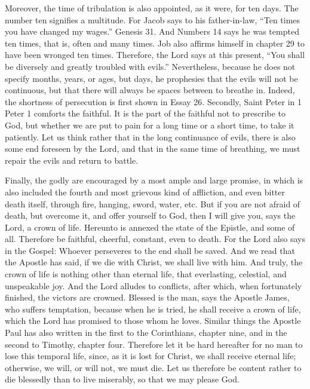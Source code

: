 Moreover, the time of tribulation is also appointed, as it were, for ten days. The number ten signifies a multitude. For Jacob says to his father-in-law, “Ten times you have changed my wages.” Genesis 31. And Numbers 14 says he was tempted ten times, that is, often and many times. Job also affirms himself in chapter 29 to have been wronged ten times. Therefore, the Lord says at this present, “You shall be diversely and greatly troubled with evils.” Nevertheless, because he does not specify months, years, or ages, but days, he prophesies that the evils will not be continuous, but that there will always be spaces between to breathe in. Indeed, the shortness of persecution is first shown in Essay 26. Secondly, Saint Peter in 1 Peter 1 comforts the faithful. It is the part of the faithful not to prescribe to God, but whether we are put to pain for a long time or a short time, to take it patiently. Let us think rather that in the long continuance of evils, there is also some end foreseen by the Lord, and that in the same time of breathing, we must repair the evils and return to battle.

Finally, the godly are encouraged by a most ample and large promise, in which is also included the fourth and most grievous kind of affliction, and even bitter death itself, through fire, hanging, sword, water, etc. But if you are not afraid of death, but overcome it, and offer yourself to God, then I will give you, says the Lord, a crown of life. Hereunto is annexed the state of the Epistle, and some of all. Therefore be faithful, cheerful, constant, even to death. For the Lord also says in the Gospel: Whoever perseveres to the end shall be saved. And we read that the Apostle has said, if we die with Christ, we shall live with him. And truly, the crown of life is nothing other than eternal life, that everlasting, celestial, and unspeakable joy. And the Lord alludes to conflicts, after which, when fortunately finished, the victors are crowned. Blessed is the man, says the Apostle James, who suffers temptation, because when he is tried, he shall receive a crown of life, which the Lord has promised to those whom he loves. Similar things the Apostle Paul has also written in the first to the Corinthians, chapter nine, and in the second to Timothy, chapter four. Therefore let it be hard hereafter for no man to lose this temporal life, since, as it is lost for Christ, we shall receive eternal life; otherwise, we will, or will not, we must die. Let us therefore be content rather to die blessedly than to live miserably, so that we may please God.

